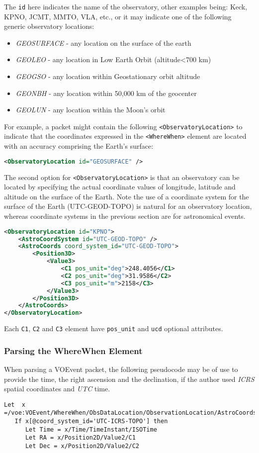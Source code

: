 \documentclass[11pt,a4paper]{ivoa}
\begin{document}
The \texttt{id} here indicates the name of the observatory, other examples being: 
Keck, KPNO, JCMT, MMTO, VLA, etc., or it may indicate one of the following 
generic observatory locations: 
\begin{itemize}
\item \emph{GEOSURFACE} - any location on the surface of the earth
\item \emph{GEOLEO} - any location in Low Earth Orbit (altitude<700 km)
\item \emph{GEOGSO} - any location within Geostationary orbit altitude
\item \emph{GEONBH} - any location within 50,000 km of the geocenter
\item \emph{GEOLUN} - any location within the Moon's orbit
\end{itemize}

For example, a packet might contain the following \texttt{<ObservatoryLocation>} 
to indicate that the coordinates expressed in the \texttt{<WhereWhen>} element are 
located with an accuracy comprising the Earth's surface: 
\begin{lstlisting}[language=XML]
<ObservatoryLocation id="GEOSURFACE" /> 
\end{lstlisting}

The second option for \texttt{<ObservatoryLocation>} is that an observatory can be 
located by specifying the actual coordinate values of longitude, latitude and 
altitude on the surface of the Earth. Note the use of a coordinate system for 
the surface of the Earth (UTC-GEOD-TOPO) is natural for an observatory location, 
whereas coordinate systems in the previous section are for astronomical events. 
\begin{lstlisting}[language=XML]
<ObservatoryLocation id="KPNO">
    <AstroCoordSystem id="UTC-GEOD-TOPO" />
    <AstroCoords coord_system_id="UTC-GEOD-TOPO">
        <Position3D>
            <Value3>
                <C1 pos_unit="deg">248.4056</C1>
                <C2 pos_unit="deg">31.9586</C2>
                <C3 pos_unit="m">2158</C3>
            </Value3>
        </Position3D>
    </AstroCoords>
</ObservatoryLocation>
\end{lstlisting}

Each \texttt{C1}, \texttt{C2} and \texttt{C3} element have \texttt{pos\_unit} and \texttt{ucd}
optional attributes. 

\subsubsection{Parsing the WhereWhen Element}
\label{sec:3.4.3}
When parsing a VOEvent packet, the following pseudocode may be of use to provide
the time, the right ascension and the declination, if the author used
\emph{ICRS} spatial coordinates and \emph{UTC} time.
\begin{lstlisting}
Let  x =/voe:VOEvent/WhereWhen/ObsDataLocation/ObservationLocation/AstroCoords
   If x[@coord_system_id='UTC-ICRS-TOPO'] then
      Let Time = x/Time/TimeInstant/ISOTime
      Let RA = x/Position2D/Value2/C1
      Let Dec = x/Position2D/Value2/C2
\end{lstlisting}
\end{document}
